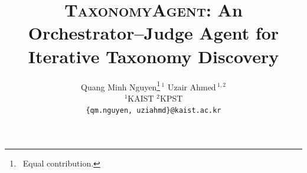 \documentclass[11pt]{article}
\title{\textsc{TaxonomyAgent}: An Orchestrator--Judge Agent for Iterative Taxonomy Discovery}
\author{
  Quang Minh Nguyen\thanks{\ Equal contribution.}\,$^{1}$ \quad
  Uzair Ahmed\footnotemark[1]\,$^{1,2}$ \\
  $^{1}$KAIST \qquad $^{2}$KPST \\
  \texttt{\{qm.nguyen, uziahmd\}@kaist.ac.kr}
}
\begin{document}
\maketitle

\begin{abstract}

\end{abstract}












\end{document}
